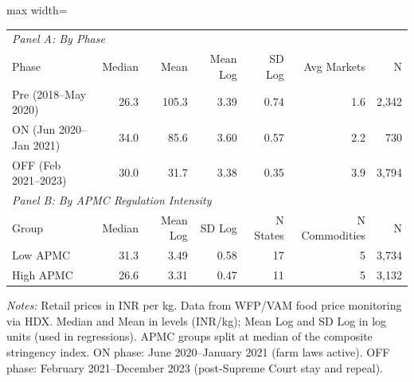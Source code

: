 \begin{adjustbox}{max width=\textwidth}
\begin{tabular}{lrrrrrr}
\toprule
\multicolumn{7}{l}{\textit{Panel A: By Phase}} \\
Phase & Median & Mean & Mean Log & SD Log & Avg Markets & N \\
\midrule
Pre (2018--May 2020) & 26.3 & 105.3 & 3.39 & 0.74 & 1.6 & 2,342 \\
ON (Jun 2020--Jan 2021) & 34.0 & 85.6 & 3.60 & 0.57 & 2.2 & 730 \\
OFF (Feb 2021--2023) & 30.0 & 31.7 & 3.38 & 0.35 & 3.9 & 3,794 \\
\midrule
\multicolumn{7}{l}{\textit{Panel B: By APMC Regulation Intensity}} \\
Group & Median & Mean Log & SD Log & N States & N Commodities & N \\
\midrule
Low APMC & 31.3 & 3.49 & 0.58 & 17 & 5 & 3,734 \\
High APMC & 26.6 & 3.31 & 0.47 & 11 & 5 & 3,132 \\
\bottomrule
\end{tabular}
\end{adjustbox}
\par\vspace{0.3em}
{\small\textit{Notes:} Retail prices in INR per kg. Data from WFP/VAM food price monitoring via HDX.
Median and Mean in levels (INR/kg); Mean Log and SD Log in log units (used in regressions).
APMC groups split at median of the composite stringency index.
ON phase: June 2020--January 2021 (farm laws active).
OFF phase: February 2021--December 2023 (post-Supreme Court stay and repeal).}
